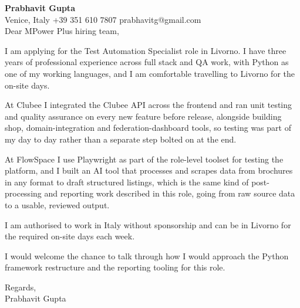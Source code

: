 \documentclass[a4paper,10.5pt]{article}
\begin{document}
\textbf{Prabhavit Gupta}\\
Venice, Italy \textbar{} +39 351 610 7807 \textbar{} prabhavitg@gmail.com\\[10pt]
Dear MPower Plus hiring team,

I am applying for the Test Automation Specialist role in Livorno. I have three years of professional experience across full stack and QA work, with Python as one of my working languages, and I am comfortable travelling to Livorno for the on-site days.

At Clubee I integrated the Clubee API across the frontend and ran unit testing and quality assurance on every new feature before release, alongside building shop, domain-integration and federation-dashboard tools, so testing was part of my day to day rather than a separate step bolted on at the end.

At FlowSpace I use Playwright as part of the role-level toolset for testing the platform, and I built an AI tool that processes and scrapes data from brochures in any format to draft structured listings, which is the same kind of post-processing and reporting work described in this role, going from raw source data to a usable, reviewed output.

I am authorised to work in Italy without sponsorship and can be in Livorno for the required on-site days each week.

I would welcome the chance to talk through how I would approach the Python framework restructure and the reporting tooling for this role.

Regards,\\
Prabhavit Gupta
\end{document}

